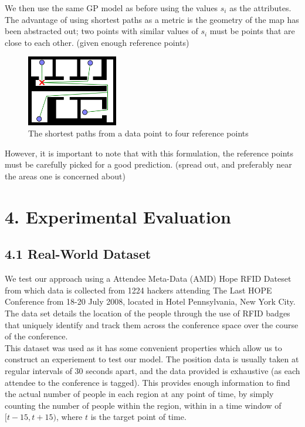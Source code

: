 \documentclass[letterpaper]{article}
\begin{document}
We then use the same GP model as before using the values $s_i$ as the attributes. The advantage of using shortest paths as a metric is the geometry of the map has been abstracted out; two points with similar values of $s_i$ must be points that are close to each other. (given enough reference points)

\begin{figure}[h!]
  \centering
    \includegraphics[width=150px,natwidth=570,natheight=442]{shortestpaths.png}
  \caption{The shortest paths from a data point to four reference points}
  \label{fig:spaths}
\end{figure}

However, it is important to note that with this formulation, the reference points must be carefully picked for a good prediction. (spread out, and preferably near the areas one is concerned about)

\section{4.  Experimental Evaluation}

\subsection{4.1  Real-World Dataset}

We test our approach using a Attendee Meta-Data (AMD) Hope RFID Dateset from which data is collected from 1224 hackers attending The Last HOPE Conference from 18-20 July 2008, located in Hotel Pennsylvania, New York City. The data set details the location of the people through the use of RFID badges that uniquely identify and track them across the conference space over the course of the conference. \\

This dataset was used as it has some convenient properties which allow us to construct an experiement to test our model. The position data is usually taken at regular intervals of $30$ seconds apart, and the data provided is exhaustive (as each attendee to the conference is tagged). This provides enough information to find the actual number of people in each region at any point of time, by simply counting the number of people within the region, within in a time window of $[t-15,t+15)$, where $t$ is the target point of time. 
\end{document}
